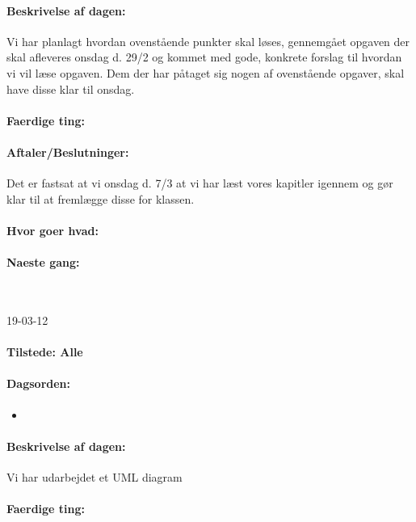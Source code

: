 \documentclass[a4paper,10pt,titlepage]{article}
\begin{document}
		\paragraph{Beskrivelse af dagen:}
		Vi har planlagt hvordan ovenstående punkter skal løses, gennemgået opgaven der skal afleveres onsdag d. 29/2 og kommet med gode, konkrete forslag til hvordan vi vil læse opgaven.
Dem der har påtaget sig nogen af ovenstående opgaver, skal have disse klar til onsdag.

		\paragraph{Faerdige ting:}
		
		\paragraph{Aftaler/Beslutninger:}
		Det er fastsat at vi onsdag d. 7/3 at vi har læst vores kapitler igennem og gør klar til at fremlægge disse for klassen.
		\paragraph{Hvor goer hvad:}
		
		\paragraph{Naeste gang:}\mbox{}\\
		
		\begin{center}
		19-03-12
		\end{center}
		
		\paragraph{Tilstede: Alle}
		\paragraph{Dagsorden:}
		\begin{itemize}
					\item 
		\end{itemize}
		
		\paragraph{Beskrivelse af dagen:}
		Vi har udarbejdet et UML diagram
		\paragraph{Faerdige ting:}
		
\end{document}
